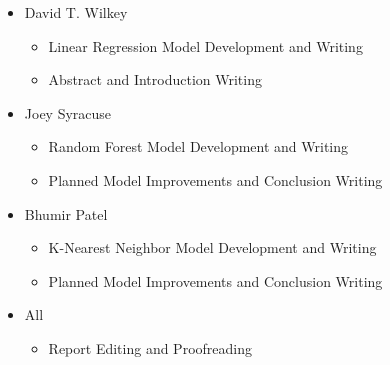 \documentclass[conference]{IEEEtran}
\begin{document}
\begin{itemize}
    \item David T. Wilkey
    \begin{itemize}
        \item Linear Regression Model Development and Writing
        \item Abstract and Introduction Writing
    \end{itemize}
    \item Joey Syracuse
    \begin{itemize}
        \item Random Forest Model Development and Writing 
        \item Planned Model Improvements and Conclusion Writing
    \end{itemize}
    \item Bhumir Patel
    \begin{itemize}
        \item K-Nearest Neighbor Model Development and Writing
        \item Planned Model Improvements and Conclusion Writing
    \end{itemize}
    \end{itemize}
    \begin{itemize}
        \item All
        \begin{itemize}
            \item Report Editing and Proofreading
        \end{itemize}
    \end{itemize}
\end{document}
